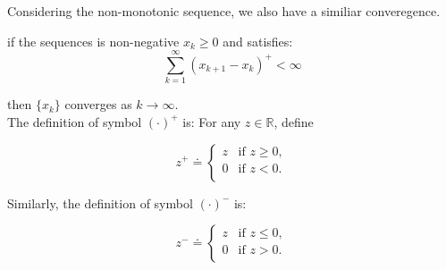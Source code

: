 Considering the non-monotonic sequence, we also have a similiar converegence.

\begin{theorem}
	if the sequences is non-negative $x_{k}\ge 0$ and satisfies:
	\begin{equation}\label{nonmono-condition}
		\sum_{k=1}^{\infty}(x_{k+1}-x_{k})^+ < \infty
	\end{equation}

	then $\{x_{k}\}$ converges as $k \to \infty$. \\ The definition of symbol $(\cdot)^+$ is: For any $z \in \mathbb{R}$, define

	\begin{equation*}
		z^+ \doteq
		\begin{cases}
			z & \text{if } z\ge 0, \\
			0 & \text{if } z<0.    \\
		\end{cases}
	\end{equation*}

	Similarly, the definition of symbol $(\cdot)^-$ is:

	\begin{equation*}
		z^- \doteq
		\begin{cases}
			z & \text{if } z\le 0, \\
			0 & \text{if } z>0.    \\
		\end{cases}
	\end{equation*}
\end{theorem}

